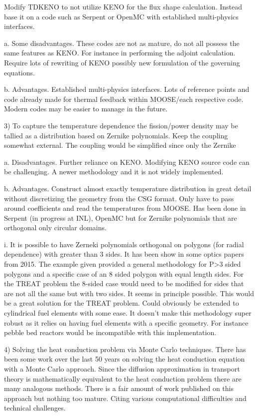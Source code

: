 \documentclass[11pt]{article}
\begin{document}
	Modify TDKENO to not utilize KENO for the flux shape calculation.  Instead base it on a code such as Serpent or OpenMC with established multi-physics interfaces. 

a.	Some disadvantages.  These codes are not as mature, do not all possess the same features as KENO.  For instance in performing the adjoint calculation.   Require lots of rewriting of KENO possibly new formulation of the governing equations.

b.	Advantages.  Established multi-physics interfaces.  Lots of reference points and code already made for thermal feedback within MOOSE/each respective code. Modern codes may be easier to manage in the future. 

3)	To capture the temperature dependence the fission/power density may be tallied as a distribution based on Zernike polynomials.  Keep the coupling somewhat external.  The coupling would be simplified since only the Zernike

a.	Disadvantages.  Further reliance on KENO.  Modifying KENO source code can be challenging.  A newer methodology and it is not widely implemented.

b.	Advantages.  Construct almost exactly temperature distribution in great detail without discretizing the geometry from the CSG format.  Only have to pass around coefficients and read the temperatures from MOOSE.  Has been done in Serpent (in progress at INL), OpenMC but for Zernike polynomials that are orthogonal only circular domains.  

i.	It is possible to have Zerneki polynomials orthogonal on polygons (for radial dependence) with greater than 3 sides.  It has been show in some optics papers from 2015.  The example given provided a general methodology for P>3 sided polygons and a specific case of an 8 sided polygon with equal length sides.  For the TREAT problem the 8-sided case would need to be modified for sides that are not all the same but with two sides.  It seems in principle possible.  This would be a great solution for the TREAT problem. Could obviously be extended to cylindrical fuel elements with some ease.  It doesn’t make this methodology super robust as it relies on having fuel elements with a specific geometry.  For instance pebble bed reactors would be incompatible with this implementation. 

4)	Solving the heat conduction problem via Monte Carlo techniques.  There has been some work over the last 50 years on solving the heat conduction equation with a Monte Carlo approach.  Since the diffusion approximation in transport theory is mathematically equivalent to the heat conduction problem there are many analogous methods.  There is a fair amount of work published on this approach but nothing too mature.  Citing various computational difficulties and technical challenges. 
\end{document}
